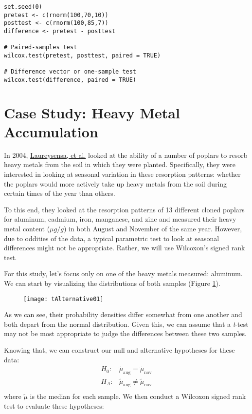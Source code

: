 \begin{framed}
\begin{Verbatim}[samepage=TRUE]
set.seed(0)
pretest <- c(rnorm(100,70,10))
posttest <- c(rnorm(100,85,7))
difference <- pretest - posttest

# Paired-samples test
wilcox.test(pretest, posttest, paired = TRUE)

# Difference vector or one-sample test
wilcox.test(difference, paired = TRUE)
\end{Verbatim}
\end{framed}

\section{Case Study: Heavy Metal Accumulation}

In 2004, \href{http://www.sciencedirect.com/science/article/pii/S0269749104001058}{Laureysensa, et al.} looked at the ability of a number of poplars to resorb heavy metals from the soil in which they were planted. Specifically, they were interested in looking at seasonal variation in these resorption patterns: whether the poplars would more actively take up heavy metals from the soil during certain times of the year than others.

To this end, they looked at the resorption patterns of 13 different cloned poplars for aluminum, cadmium, iron, manganese, and zinc and measured their heavy metal content ($\mu g/g$) in both August and November of the same year. However, due to oddities of the data, a typical parametric test to look at seasonal differences might not be appropriate. Rather, we will use Wilcoxon's signed rank test.

For this study, let's focus only on one of the heavy metals measured: aluminum. We can start by visualizing the distributions of both samples (Figure \ref{fig:tAlt01}).

\begin{figure}[htp]
\texttt{[image: tAlternative01]}
\caption{}
\label{fig:tAlt01}
\end{figure}

As we can see, their probability densities differ somewhat from one another and both depart from the normal distribution. Given this, we can assume that a \textit{t}-test may not be most appropriate to judge the differences between these two samples.

Knowing that, we can construct our null and alternative hypotheses for these data:
\begin{eqnarray*}
H_0:& \tilde{\mu}_{\text{aug}} = \tilde{\mu}_{\text{nov}} \\
H_A:&  \tilde{\mu}_{\text{aug}} \neq \tilde{\mu}_{\text{nov}} \\
\end{eqnarray*}
where $\tilde{\mu}$ is the median for each sample. We then conduct a Wilcoxon signed rank test to evaluate these hypotheses:

